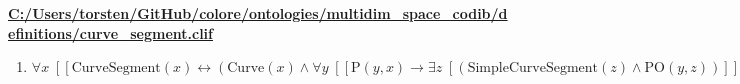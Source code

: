 \documentclass{article}
\begin{document}
\textbf{\url{C:/Users/torsten/GitHub/colore/ontologies/multidim\_space\_codib/definitions/curve\_segment.clif}}

\begin{enumerate}
\item $\forall x\;  \left[ \left[ \textrm{CurveSegment}(x) \leftrightarrow \left(\textrm{Curve}(x) \land \forall y\;  \left[ \left[ \textrm{P}(y,x) \rightarrow \exists z\;  \left[ \left(\textrm{SimpleCurveSegment}(z) \land \textrm{PO}(y,z)\right) \right] \right] \right]\right) \right] \right]$
\end{enumerate}
\end{document}
